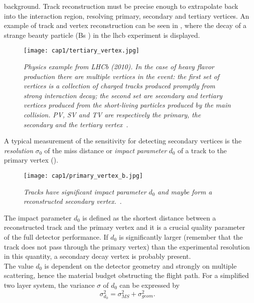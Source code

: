 background. Track reconstruction must be precise enough to extrapolate back into
the interaction region, resolving primary, secondary and tertiary vertices. An
example of track and vertex reconstruction can be seen in ,
where the decay of a strange beauty particle (Bs ) in the \gls{lhcb} experiment
is displayed.
\begin{figure}[!htbp]
  \centering\texttt{[image: cap1/tertiary\_vertex.jpg]}
  \caption{\textit{Physics example from LHCb (2010). In the case of heavy flavor
      production there are multiple vertices in the event: the first set of
      vertices is a collection of charged tracks produced promptly from strong
      interaction decay; the second set are secondary and tertiary vertices
      produced from the short-living particles produced by the main
      collision. PV, SV and TV are respectively the primary, the secondary and
      the tertiary vertex~\cite{Hebbeker}.}}\label{Hebbeker_1}
\end{figure}
A typical measurement of the sensitivity for detecting secondary vertices is the
{\it resolution} $\sigma_0$ of the miss distance or {\it impact parameter} $d_0$
of a track to the primary vertex ().
\begin{figure}[!htbp]
  \centering\texttt{[image: cap1/primary\_vertex\_b.jpg]}
  \caption{\textit{Tracks have significant impact parameter $d_0$ and maybe form
      a reconstructed secondary vertex.}~\cite{Wells}.}\label{Wells_1}
\end{figure}
The impact parameter $d_0$ is defined as the shortest distance between a
reconstructed track and the primary vertex and it is a crucial quality parameter
of the full detector performance. If $d_0$ is significantly larger (remember
that the track does not pass through the primary vertex) than the experimental
resolution in this quantity, a
secondary decay vertex is probably present.\\
The value $d_0$ is dependent on the detector geometry and strongly on multiple
scattering, hence the material budget obstructing the flight path. For a
simplified two layer system, the variance $\sigma$ of $d_0$ can be expressed
by~\cite{Hartmann}
\begin{equation}\label{sigma_d0}
  \sigma_{d_0}^2 = \sigma_{MS}^2 + \sigma_{geom}^2.
\end{equation}

